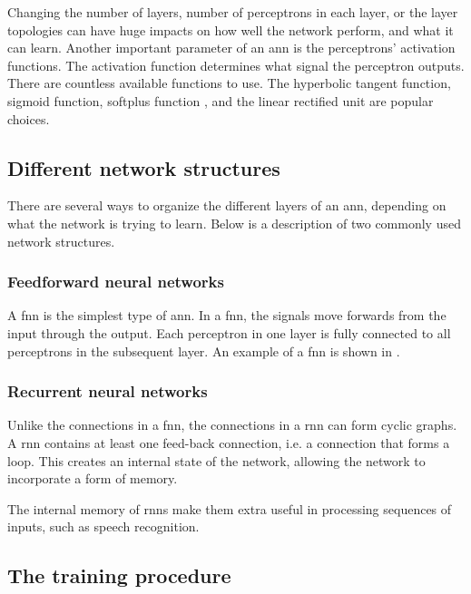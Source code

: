 Changing the number of layers, number of perceptrons in each layer, or the layer topologies can have huge impacts on how well the network perform, and what it can learn. Another important parameter of an \gls{ann} is the perceptrons' activation functions. The activation function determines what signal the perceptron outputs. There are countless available functions to use. The hyperbolic tangent function, sigmoid function, softplus function \citep{bib:glorot2011deep}, and the linear rectified unit \citep{bib:nair2010rectified} are popular choices.


\subsection{Different network structures}
\label{subsec:network-types}

There are several ways to organize the different layers of an \gls{ann}, depending on what the network is trying to learn. Below is a description of two commonly used network structures.

\subsubsection{Feedforward neural networks}

A \gls{fnn} is the simplest type of \gls{ann}. In a \gls{fnn}, the signals move forwards from the input through the output. Each perceptron in one layer is fully connected to all perceptrons in the subsequent layer. An example of a \gls{fnn} is shown in .

\subsubsection{Recurrent neural networks}

Unlike the connections in a \gls{fnn}, the connections in a \gls{rnn} can form cyclic graphs. A \gls{rnn} contains at least one feed-back connection, i.e. a connection that forms a loop. This creates an internal state of the network, allowing the network to incorporate a form of memory.

The internal memory of \glspl{rnn} make them extra useful in processing sequences of inputs, such as speech recognition.


\subsection{The training procedure}

